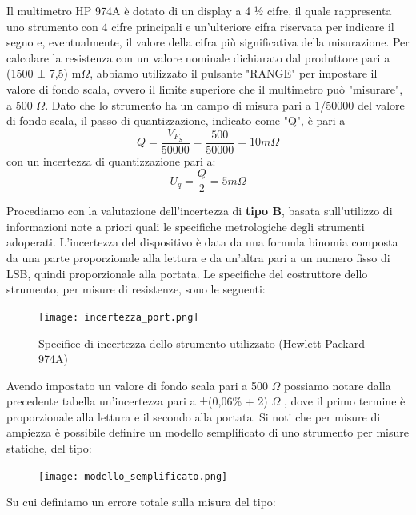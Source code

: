 Il multimetro HP 974A è dotato di un display a 4 ½ cifre, il quale rappresenta uno strumento con 4 cifre principali e un'ulteriore cifra riservata per indicare il segno e, eventualmente, il valore della cifra più significativa della misurazione. Per calcolare la resistenza con un valore nominale dichiarato dal produttore pari a (1500 ± 7,5) m$\Omega$, abbiamo utilizzato il pulsante "RANGE" per impostare il valore di fondo scala, ovvero il limite superiore che il multimetro può "misurare", a 500 $\Omega$. Dato che lo strumento ha un campo di misura pari a 1/50000 del valore di fondo scala, il passo di quantizzazione, indicato come "Q", è pari a
\begin{equation}
    Q = \frac{V_{F_S}}{50000} = \frac{500}{50000} = 10 m\Omega
\end{equation}
con un incertezza di quantizzazione pari a: 
\begin{equation}
    U_q = \frac{Q}{2} = 5 m\Omega
\end{equation}

Procediamo con la valutazione dell'incertezza di \textbf{tipo B}, basata sull'utilizzo di informazioni note a priori quali le specifiche metrologiche degli strumenti adoperati. L’incertezza del dispositivo è data da una formula binomia composta da una parte proporzionale alla lettura e da un’altra pari a un numero fisso di LSB, quindi 
 proporzionale alla portata. Le specifiche del costruttore dello strumento, per misure di resistenze, sono le seguenti:

\begin{figure}[h]
    \centering
    \texttt{[image: incertezza\_port.png]}
    \caption{Specifice di incertezza dello strumento utilizzato (Hewlett Packard 974A)}
    \label{fig:Incertezza_multimetro_port}
\end{figure}
\FloatBarrier

Avendo impostato un valore di fondo scala pari a 500 $\Omega$ possiamo notare dalla precedente tabella un’incertezza pari a ±(0,06\% + 2) $\Omega$ , dove il primo termine è proporzionale alla lettura e il secondo alla portata. Si noti che per misure di ampiezza è possibile definire un modello semplificato di uno strumento per misure statiche, del tipo:

\begin{figure}[h]
    \centering
    \texttt{[image: modello\_semplificato.png]}
    \label{fig:modello}
\end{figure}
\FloatBarrier

Su cui definiamo un errore totale sulla misura del tipo:


